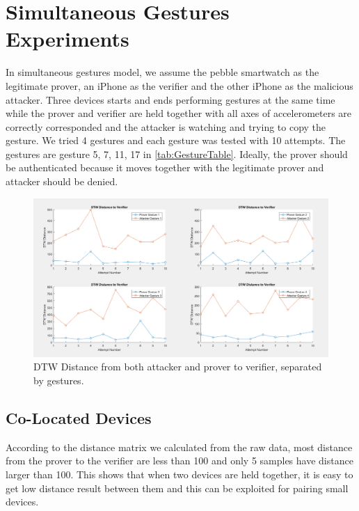 


\section{Simultaneous Gestures \\ Experiments}
\label{sec:Simultaneous}
In simultaneous gestures model, we assume the pebble smartwatch as the legitimate prover, an iPhone as the verifier and the other iPhone as the malicious attacker. Three devices starts and ends performing gestures at the same time while the prover and verifier are held together with all axes of accelerometers are correctly corresponded and the attacker is watching and trying to copy the gesture. We tried 4 gestures and each gesture was tested with 10 attempts. The gestures are gesture 5, 7, 11, 17 in \autoref{tab:GestureTable}. Ideally, the prover should be authenticated because it moves together with the legitimate prover and attacker should be denied.

\begin{figure}[!tb]
\centering
\includegraphics[width= \linewidth]{./figures/simultaneous_model_distance_matrix.png}
\caption{DTW Distance from both attacker and prover to verifier, separated by gestures.}
\label{fig:SimultaneousDistanceMatrixPlot}
\end{figure}

\subsection{Co-Located Devices}
According to the distance matrix we calculated from the raw data, most distance from the prover to the verifier are less than 100 and only 5 samples have distance larger than 100. This shows that when two devices are held together, it is easy to get low distance result between them and this can be exploited for pairing small devices.

